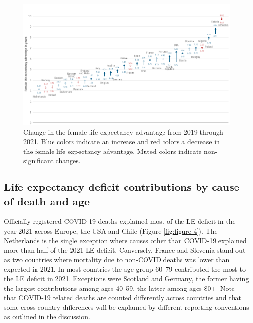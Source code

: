 \documentclass[12pt]{article}
\begin{document}
\begin{figure}[ht!]
    \centering
    \includegraphics{figure-3.pdf}
    \caption{Change in the female life expectancy advantage from 2019 through 2021. Blue colors indicate an increase and red colors a decrease in the female life expectancy advantage. Muted colors indicate non-significant changes.}
    \label{fig:figure-3}
\end{figure}

\subsection*{Life expectancy deficit contributions by cause of death and age}

Officially registered COVID-19 deaths explained most of the LE deficit in the year 2021 across Europe, the USA and Chile (Figure \ref{fig:figure-4}). The Netherlands is the single exception where causes other than COVID-19 explained more than half of the 2021 LE deficit. Conversely, France and Slovenia stand out as two countries where mortality due to non-COVID deaths was lower than expected in 2021. In most countries the age group 60--79 contributed the most to the LE deficit in 2021. Exceptions were Scotland and Germany, the former having the largest contributions among ages 40--59, the latter among ages 80+. Note that COVID-19 related deaths are counted differently across countries and that some cross-country differences will be explained by different reporting conventions as outlined in the discussion.
\end{document}
